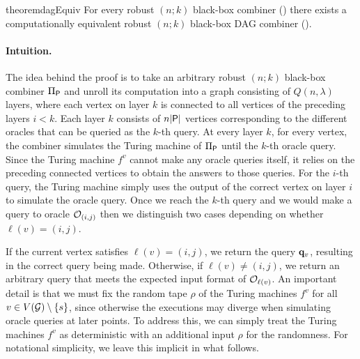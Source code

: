 \begin{restatable}{theorem}{dagEquiv}\label{thm:generality_dag_comb}
	For every robust $(n;k)$ black-box combiner () there exists a computationally equivalent 
	robust $(n;k)$ black-box DAG combiner ().
\end{restatable}

\paragraph{Intuition.}
The idea behind the proof is to take an arbitrary robust $(n;k)$ black-box combiner $\BBComb{P}$
and unroll its computation into a graph consisting of $Q(n,\lambda)$ layers, where each vertex on layer $k$ is connected 
to all vertices of the preceding layers $i < k$. Each layer $k$ consists of $n| \textup{\textsf{P}} |$ vertices corresponding to the different oracles that 
can be queried as the $k$-th query. At every layer $k$, for every vertex, the combiner simulates the Turing machine 
of $\BBComb{P}$ until the $k$-th oracle query. Since the Turing machine $f^v$ cannot make any oracle queries itself, it relies on the preceding connected
vertices to obtain the answers to those queries. For the $i$-th query, the Turing machine 
simply uses the output of the correct vertex on layer $i$ to simulate the oracle query. 
Once we reach the $k$-th query and we would make a query to oracle $\mathcal{O}_{(i,j)}$ then we distinguish two cases 
depending on whether $\ell(v) = (i,j)$.

If the current vertex satisfies $\ell(v) = (i,j)$, we return the query $\mathbf{q}_v$, resulting in the correct query being made.
Otherwise, if $\ell(v) \neq (i,j)$, we return an arbitrary query that meets the expected input format of $\mathcal{O}_{\ell(v)}$.
An important detail is that we must fix the random tape $\rho$ of the Turing machines $f^v$ for all $v \in V(\mathcal{G}) \setminus \{s\}$, 
since otherwise the executions may diverge when simulating oracle queries at later points. To address this, we can simply treat the Turing machines 
$f^v$ as deterministic with an additional input $\rho$ for the randomness. For notational simplicity, we leave this implicit in what follows.

